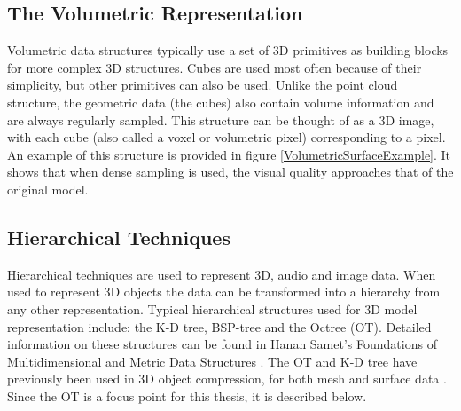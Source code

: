 
\subsection{The Volumetric Representation}

Volumetric data structures typically use a set of 3D primitives as building blocks for more complex 3D structures. Cubes are used most often because of their simplicity, but other primitives can also be used. Unlike the point cloud structure, the geometric data (the cubes) also contain volume information and are always regularly sampled. This structure can be thought of as a 3D image, with each cube (also called a voxel or volumetric pixel) corresponding to a pixel. An example of this structure is provided in figure \ref{VolumetricSurfaceExample}. It shows that when dense sampling is used, the visual quality approaches that of the original model. 




\subsection{Hierarchical Techniques}

Hierarchical techniques are used to represent 3D, audio and image data. When used to represent 3D objects the data can be transformed into a hierarchy from any other representation. Typical hierarchical structures used for 3D model representation include: the K-D tree, BSP-tree and the Octree (OT). Detailed information on these structures can be found in Hanan Samet's Foundations of Multidimensional and Metric Data Structures \cite{Samet06Foundations}. The OT and K-D tree have previously been used in 3D object compression, for both mesh \cite{Peng05Geometry-Guided} and surface data \cite{Schnabel06Octree}. Since the OT is a focus point for this thesis, it is described below.

